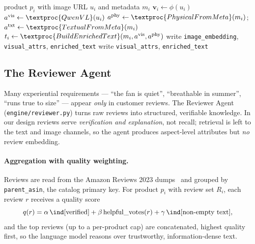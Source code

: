 \begin{algorithm}[t]
\caption{Offline catalog enrichment (per product)}
\label{alg:enrich}
\begin{algorithmic}[1]
\Require product $p_i$ with image URL $u_i$ and metadata $m_i$
\State $\mathbf{v}_i \gets \phi(u_i)$ 
\State $a^{\mathrm{vis}} \gets \textproc{QwenVL}(u_i)$ 
\State $a^{\mathrm{phy}} \gets \textproc{PhysicalFromMeta}(m_i)$;\quad
       $a^{\mathrm{txt}} \gets \textproc{TextualFromMeta}(m_i)$
\State $t_i \gets \textproc{BuildEnrichedText}(m_i, a^{\mathrm{vis}}, a^{\mathrm{phy}})$
  \State write \texttt{image\_embedding}, \texttt{visual\_attrs}, \texttt{enriched\_text}
\Else
  \State write \texttt{visual\_attrs}, \texttt{enriched\_text} 
\EndIf
\end{algorithmic}
\end{algorithm}

\subsection{The Reviewer Agent}
\label{sec:reviewer}

Many experiential requirements --- ``the fan is quiet'', ``breathable in
summer'', ``runs true to size'' --- appear \emph{only} in customer reviews. The
Reviewer Agent (\texttt{engine/reviewer.py}) turns raw reviews into structured,
verifiable knowledge. In our design reviews serve \emph{verification and
explanation}, not recall; retrieval is left to the text and image channels, so
the agent produces aspect-level attributes but \emph{no} review embedding.

\paragraph{Aggregation with quality weighting.}
Reviews are read from the Amazon Reviews 2023 dumps~\cite{hou2024bridging} and grouped by
\texttt{parent\_asin}, the catalog primary key. For product $p_i$ with review set
$R_i$, each review $r$ receives a quality score
\begin{equation}
  q(r)=\alpha\,\ind[\text{verified}]
       +\beta\,\mathrm{helpful\_votes}(r)
       +\gamma\,\ind[\text{non-empty text}],
  \label{eq:quality}
\end{equation}
and the top reviews (up to a per-product cap) are concatenated, highest quality
first, so the language model reasons over trustworthy, information-dense text.

